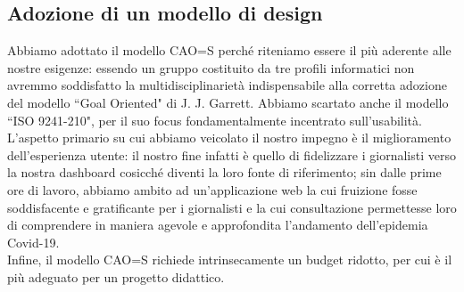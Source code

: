 \subsection{Adozione di un modello di design}

Abbiamo adottato il modello CAO=S perché riteniamo essere il più aderente alle nostre esigenze: essendo un gruppo costituito da tre profili informatici non avremmo soddisfatto la multidisciplinarietà indispensabile alla corretta adozione del modello ``Goal Oriented" di J. J. Garrett. Abbiamo scartato anche il modello ``ISO 9241-210", per il suo focus fondamentalmente incentrato sull'usabilità. L'aspetto primario su cui abbiamo veicolato il nostro impegno è il miglioramento dell'esperienza utente: il nostro fine infatti è quello di fidelizzare i giornalisti verso la nostra dashboard cosicché diventi la loro fonte di riferimento; sin dalle prime ore di lavoro, abbiamo ambito ad un'applicazione web la cui fruizione fosse soddisfacente e gratificante per i giornalisti e la cui consultazione permettesse loro di comprendere in maniera agevole e approfondita l'andamento dell'epidemia Covid-19.\\
Infine, il modello CAO=S richiede intrinsecamente un budget ridotto, per cui è il più adeguato per un progetto didattico. 